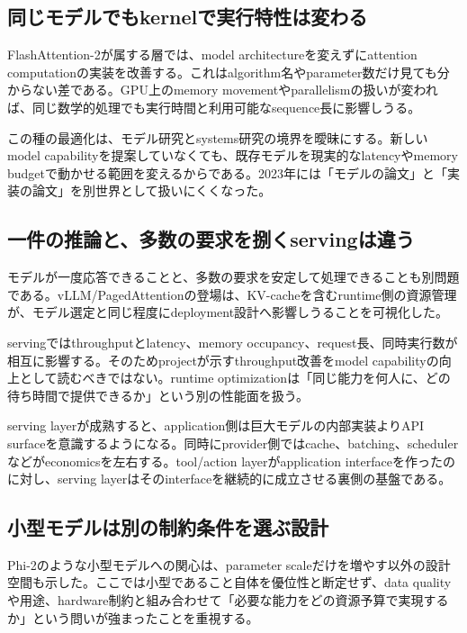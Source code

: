 \subsection{同じモデルでもkernelで実行特性は変わる}

FlashAttention-2が属する層では、model architectureを変えずにattention computationの実装を改善する。これはalgorithm名やparameter数だけ見ても分からない差である。GPU上のmemory movementやparallelismの扱いが変われば、同じ数学的処理でも実行時間と利用可能なsequence長に影響しうる。\autocite{src-5e1a3a4fc45b}


この種の最適化は、モデル研究とsystems研究の境界を曖昧にする。新しいmodel capabilityを提案していなくても、既存モデルを現実的なlatencyやmemory budgetで動かせる範囲を変えるからである。2023年には「モデルの論文」と「実装の論文」を別世界として扱いにくくなった。\autocite{src-5e1a3a4fc45b}


\subsection{一件の推論と、多数の要求を捌くservingは違う}

モデルが一度応答できることと、多数の要求を安定して処理できることも別問題である。vLLM/PagedAttentionの登場は、KV-cacheを含むruntime側の資源管理が、モデル選定と同じ程度にdeployment設計へ影響しうることを可視化した。\autocite{src-1ab9d44a819a,src-e03b0ba5b24e,src-fb804ac849e4}


servingではthroughputとlatency、memory occupancy、request長、同時実行数が相互に影響する。そのためprojectが示すthroughput改善をmodel capabilityの向上として読むべきではない。runtime optimizationは「同じ能力を何人に、どの待ち時間で提供できるか」という別の性能面を扱う。\autocite{src-1ab9d44a819a,src-e03b0ba5b24e,src-fb804ac849e4}


serving layerが成熟すると、application側は巨大モデルの内部実装よりAPI surfaceを意識するようになる。同時にprovider側ではcache、batching、schedulerなどがeconomicsを左右する。tool/action layerがapplication interfaceを作ったのに対し、serving layerはそのinterfaceを継続的に成立させる裏側の基盤である。\autocite{src-1ab9d44a819a,src-e03b0ba5b24e,src-fb804ac849e4}


\subsection{小型モデルは別の制約条件を選ぶ設計}

Phi-2のような小型モデルへの関心は、parameter scaleだけを増やす以外の設計空間も示した。ここでは小型であること自体を優位性と断定せず、data qualityや用途、hardware制約と組み合わせて「必要な能力をどの資源予算で実現するか」という問いが強まったことを重視する。\autocite{src-6e61359d2fae}



